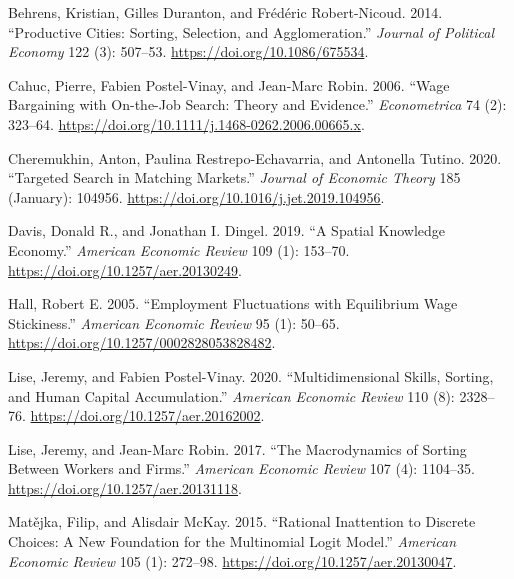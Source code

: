 \documentclass[
  letterpaper,
  DIV=11,
  numbers=noendperiod]{scrreprt}
\newlength{\cslhangindent}
\newlength{\cslentryspacingunit} %
\newenvironment{CSLReferences}[2] %
 {%
  \setlength{\parindent}{0pt}
  \ifodd #1
  \let\oldpar\par
  \def\par{\hangindent=\cslhangindent\oldpar}
  \fi
  \setlength{\parskip}{#2\cslentryspacingunit}
 }%
 {}
\begin{document}
\hypertarget{refs}{}
\begin{CSLReferences}{1}{0}
\leavevmode{}%
Behrens, Kristian, Gilles Duranton, and Frédéric Robert-Nicoud. 2014.
{``Productive {Cities}: {Sorting}, {Selection}, and {Agglomeration}.''}
\emph{Journal of Political Economy} 122 (3): 507--53.
\url{https://doi.org/10.1086/675534}.

\leavevmode{}%
Cahuc, Pierre, Fabien Postel-Vinay, and Jean-Marc Robin. 2006. {``Wage
{Bargaining} with {On-the-Job Search}: {Theory} and {Evidence}.''}
\emph{Econometrica} 74 (2): 323--64.
\url{https://doi.org/10.1111/j.1468-0262.2006.00665.x}.

\leavevmode{}%
Cheremukhin, Anton, Paulina Restrepo-Echavarria, and Antonella Tutino.
2020. {``Targeted Search in Matching Markets.''} \emph{Journal of
Economic Theory} 185 (January): 104956.
\url{https://doi.org/10.1016/j.jet.2019.104956}.

\leavevmode{}%
Davis, Donald R., and Jonathan I. Dingel. 2019. {``A {Spatial Knowledge
Economy}.''} \emph{American Economic Review} 109 (1): 153--70.
\url{https://doi.org/10.1257/aer.20130249}.

\leavevmode{}%
Hall, Robert E. 2005. {``Employment {Fluctuations} with {Equilibrium
Wage Stickiness}.''} \emph{American Economic Review} 95 (1): 50--65.
\url{https://doi.org/10.1257/0002828053828482}.

\leavevmode{}%
Lise, Jeremy, and Fabien Postel-Vinay. 2020. {``Multidimensional
{Skills}, {Sorting}, and {Human Capital Accumulation}.''} \emph{American
Economic Review} 110 (8): 2328--76.
\url{https://doi.org/10.1257/aer.20162002}.

\leavevmode{}%
Lise, Jeremy, and Jean-Marc Robin. 2017. {``The {Macrodynamics} of
{Sorting} Between {Workers} and {Firms}.''} \emph{American Economic
Review} 107 (4): 1104--35. \url{https://doi.org/10.1257/aer.20131118}.

\leavevmode{}%
Matějka, Filip, and Alisdair McKay. 2015. {``Rational {Inattention} to
{Discrete Choices}: {A New Foundation} for the {Multinomial Logit
Model}.''} \emph{American Economic Review} 105 (1): 272--98.
\url{https://doi.org/10.1257/aer.20130047}.


\end{CSLReferences}
\end{document}
